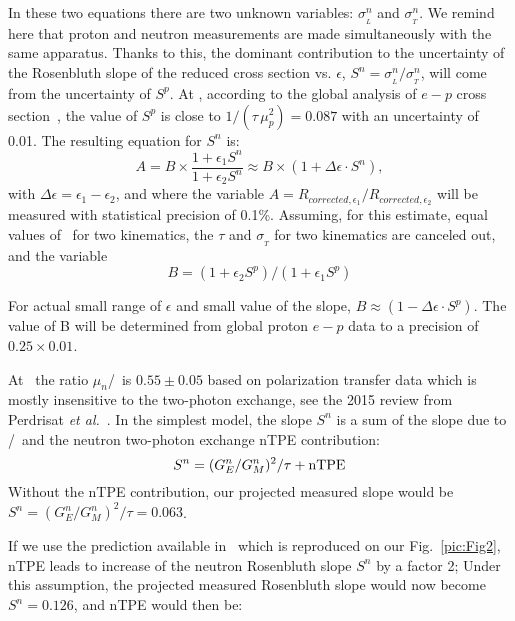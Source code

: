 In these two equations there are two unknown variables: $\sigma_{_L}^n$ and $\sigma_{_T}^n$.
We remind here that proton and neutron measurements are made simultaneously with the same apparatus. 
Thanks to this, the dominant contribution to the uncertainty of the Rosenbluth slope of the reduced cross section vs. $\epsilon$,  
$S^n = \sigma_{_L}^n/ \sigma_{_T}^n$, will come from the uncertainty of $S^p$.
At  \gevcsq, according to the global analysis of $e-p$ cross section~\cite{Christy2020ab}, the value of $S^p$ is close to $1/(\tau \, \mu_p^2) = 0.087$ with an uncertainty of 0.01.
The resulting equation for $S^n$ is:
\begin{equation*}
A = B \times \frac{1 + \epsilon_1 S^n}{1 + \epsilon_2 S^n} \approx B \times (1 +  \Delta \epsilon \cdot S^n),
\end{equation*}
with $\Delta \epsilon = \epsilon_1 -\epsilon_2$, and 
where the variable $A = R_{{corrected},\epsilon_1}/R_{{corrected},\epsilon_2}$ will be measured with statistical precision of 0.1\%.  
Assuming, for this estimate, equal values of \qsq~for two kinematics, the  $\tau$ and $\sigma_{_T}$ for two kinematics are canceled out, and the variable
\begin{equation}
  B = %
  (1 + \epsilon_2 S^p )/(1 + \epsilon_1 S^p )
\end{equation}

For actual small range of $\epsilon$ and small value of the slope, $B \approx (1 - \Delta \epsilon \cdot S^p)$.
The value of B will be determined from global proton $e-p$ data to a precision of $0.25 \times 0.01$.
 
At  \gevcsq~the ratio $\mu_n$\gen/\gmn~is $0.55 \pm 0.05$ based on polarization transfer data which is mostly insensitive to the two-photon exchange, see the 2015 review from Perdrisat {\it et al.}~\cite{Punjabi:2015bba}.
%
In the simplest model, the slope $S^n$ is a sum of the slope due to \gen/\gmn~and the neutron two-photon exchange nTPE contribution:
\begin{equation}
  S^n = (G_E^n/G_M^n)^2/\tau + {\rm nTPE}
\end{equation}
Without the nTPE contribution, our projected measured slope would be $S^n = (G_E^n/G_M^n)^2/\tau = 0.063$. %

If we use the prediction available in~\cite{Blunden:2005ew} which is reproduced on our Fig.~\ref{pic:Fig2}, nTPE leads to increase of the neutron Rosenbluth slope $S^n$ by a factor 2;
Under this assumption, the projected measured Rosenbluth slope would now become $S^n = 0.126$, and nTPE would then be:

